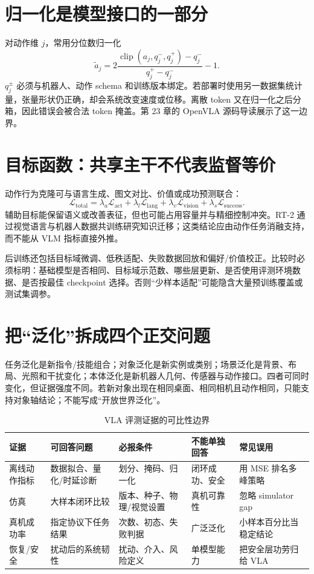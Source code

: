 \section{归一化是模型接口的一部分}

对动作维 $j$，常用分位数归一化
\begin{equation}
\tilde a_j=2\frac{\operatorname{clip}(a_j,q_j^- ,q_j^+)-q_j^-}
{q_j^+-q_j^-}-1.
\end{equation}
$q_j^\pm$ 必须与机器人、动作 schema 和训练版本绑定。若部署时使用另一数据集统计量，张量形状仍正确，却会系统改变速度或位移。离散 token 又在归一化之后分箱，因此错误会被合法 token 掩盖。第 23 章的 OpenVLA 源码导读展示了这一边界。

\section{目标函数：共享主干不代表监督等价}

动作行为克隆可与语言生成、图文对比、价值或成功预测联合：
\begin{equation}
\mathcal L_{\mathrm{total}}=\lambda_a\mathcal L_{\mathrm{act}}
+\lambda_l\mathcal L_{\mathrm{lang}}+\lambda_v\mathcal L_{\mathrm{vision}}
+\lambda_s\mathcal L_{\mathrm{success}}.
\end{equation}
辅助目标能保留语义或改善表征，但也可能占用容量并与精细控制冲突。RT-2 通过视觉语言与机器人数据共训练研究知识迁移\cite{brohan2023rt2}；这类结论应由动作任务消融支持，而不能从 VLM 指标直接外推。

后训练还包括目标域微调、低秩适配、失败数据回放和偏好/价值校正。比较时必须标明：基础模型是否相同、目标域示范数、哪些层更新、是否使用评测环境数据、是否按最佳 checkpoint 选择。否则“少样本适配”可能隐含大量预训练覆盖或测试集调参。

\section{把“泛化”拆成四个正交问题}

任务泛化是新指令/技能组合；对象泛化是新实例或类别；场景泛化是背景、布局、光照和干扰变化；本体泛化是新机器人几何、传感器与动作接口。四者可同时变化，但证据强度不同。若新对象出现在相同桌面、相同相机且动作相同，只能支持对象轴结论；不能写成“开放世界泛化”。

\begin{table}[H]
\centering
\caption{VLA 评测证据的可比性边界}
\label{tab:vla-evidence-comparability}
\begin{tabularx}{\textwidth}{p{}YYYY}
\toprule
证据 & 可回答问题 & 必报条件 & 不能单独回答 & 常见误用 \\
\midrule
离线动作指标 & 数据拟合、量化/时延诊断 & 划分、掩码、归一化 & 闭环成功、安全 & 用 MSE 排名多峰策略 \\
仿真 & 大样本闭环比较 & 版本、种子、物理/视觉设置 & 真机可靠性 & 忽略 simulator gap \\
真机成功率 & 指定协议下任务结果 & 次数、初态、失败判据 & 广泛泛化 & 小样本百分比当稳定结论 \\
恢复/安全 & 扰动后的系统韧性 & 扰动、介入、风险定义 & 单模型能力 & 把安全层功劳归给 VLA \\
\bottomrule
\end{tabularx}
\end{table}

